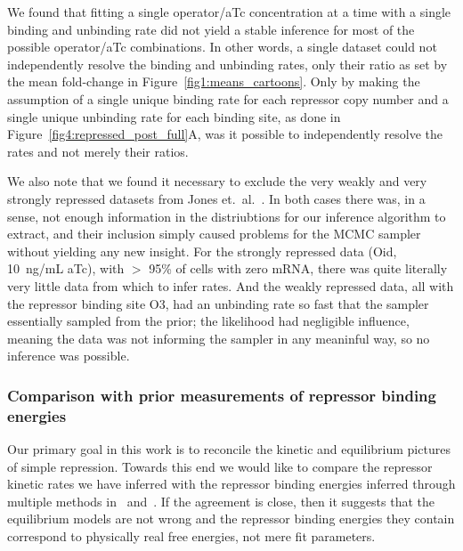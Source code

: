 
We found that fitting a single operator/aTc concentration at a
time with a single binding and unbinding rate did not yield a
stable inference for most of the possible operator/aTc
combinations. In other words, a single dataset could not
independently resolve the binding and unbinding rates, only their
ratio as set by the mean fold-change in
Figure~\ref{fig1:means_cartoons}. Only by making the assumption
of a single unique binding rate for each repressor copy number
and a single unique unbinding rate for each binding site, as done
in Figure~\ref{fig4:repressed_post_full}A, was it possible to
independently resolve the rates and not merely their ratios.

We also note that we found it necessary to exclude the very
weakly and very strongly repressed datasets from Jones et.\
al.~\cite{Jones2014}. In both cases there was, in a sense, not
enough information in the distriubtions for our inference
algorithm to extract, and their inclusion simply caused problems
for the MCMC sampler without yielding any new insight. For the
strongly repressed data (Oid, 10~ng/mL aTc), with $>$ 95\% of cells
with zero mRNA, there was quite literally very little data from
which to infer rates. And the weakly repressed data, all with the
repressor binding site O3, had an unbinding rate so fast that the
sampler essentially sampled from the prior; the likelihood had
negligible influence, meaning the data was not informing the
sampler in any meaninful way, so no inference was possible.

\subsubsection{Comparison with prior measurements of repressor binding energies}
Our primary goal in this work is to reconcile the kinetic
and equilibrium pictures of simple repression.
Towards this end we would like to compare the repressor kinetic rates we
have inferred with the repressor binding energies inferred through
multiple methods in~\cite{Garcia2011a} and~\cite{Razo-Mejia2018}.
If the agreement is close, then it suggests that the equilibrium
models are not wrong and the repressor binding energies they contain
correspond to physically real free energies, not mere fit parameters.

